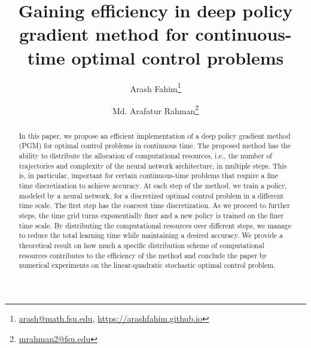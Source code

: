 \documentclass{article}
\title{Gaining efficiency in deep policy gradient method for continuous-time optimal control problems}
\author[1]{Arash Fahim\thanks{\href{mailto:arash@math.fsu.edu}{arash@math.fsu.edu}, \url{https://arashfahim.github.io}}}
\author[1]{Md. Arafatur Rahman\thanks{\href{mailto:mrahman2@fsu.edu}{mrahman2@fsu.edu}}}
\affil[1]{Department of Mathematics, Florida State University}
\numberwithin{equation}{section}
\begin{document}
\maketitle

\begin{abstract}
In this paper, we propose an efficient implementation of a deep policy gradient method (PGM) for optimal control problems in continuous time. The proposed method has the ability to distribute the allocation of computational resources, i.e., the number of trajectories and complexity of the neural network architecture, in multiple steps. This is, in particular, important for certain continuous-time problems that require a fine time discretization to achieve accuracy. At each step of the method, we train a policy, modeled by a neural network, for a discretized optimal control problem in a different time scale. The first step has the coarsest time discretization. As we proceed to further steps, the time grid turns exponentially finer and a new policy is trained on the finer time scale. By distributing the computational resources over different steps, we manage to reduce the total learning time while maintaining a desired accuracy. We provide a theoretical result on how much a specific distribution scheme of computational resources contributes to the efficiency of the method and conclude the paper by numerical experiments on the linear-quadratic stochastic optimal control problem. 
\end{abstract}

\maketitle



\end{document}
